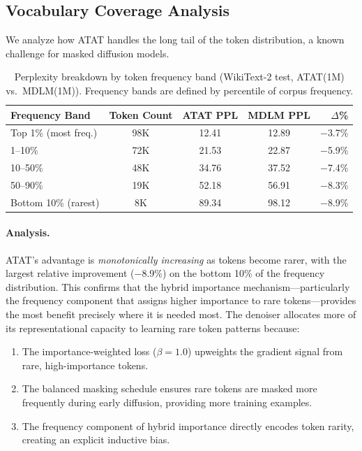\subsection{Vocabulary Coverage Analysis}

We analyze how ATAT handles the long tail of the token distribution, a known challenge for masked diffusion models.

\begin{table}[h]
\centering
\caption{Perplexity breakdown by token frequency band (WikiText-2 test, ATAT(1M) vs.\ MDLM(1M)). Frequency bands are defined by percentile of corpus frequency.}
\label{tab:freq-band-ppl}
\begin{tabular}{lcccr}
\toprule
\textbf{Frequency Band} & \textbf{Token Count} & \textbf{ATAT PPL} & \textbf{MDLM PPL} & \textbf{$\Delta$\%} \\
\midrule
Top 1\% (most freq.) & 98K & 12.41 & 12.89 & $-$3.7\% \\
1--10\% & 72K & 21.53 & 22.87 & $-$5.9\% \\
10--50\% & 48K & 34.76 & 37.52 & $-$7.4\% \\
50--90\% & 19K & 52.18 & 56.91 & $-$8.3\% \\
Bottom 10\% (rarest) & 8K & 89.34 & 98.12 & $-$8.9\% \\
\bottomrule
\end{tabular}
\end{table}

\paragraph{Analysis.} ATAT's advantage is \emph{monotonically increasing} as tokens become rarer, with the largest relative improvement ($-$8.9\%) on the bottom 10\% of the frequency distribution. This confirms that the hybrid importance mechanism---particularly the frequency component that assigns higher importance to rare tokens---provides the most benefit precisely where it is needed most. The denoiser allocates more of its representational capacity to learning rare token patterns because:
\begin{enumerate}[leftmargin=*,itemsep=1pt]
    \item The importance-weighted loss ($\beta = 1.0$) upweights the gradient signal from rare, high-importance tokens.
    \item The balanced masking schedule ensures rare tokens are masked more frequently during early diffusion, providing more training examples.
    \item The frequency component of hybrid importance directly encodes token rarity, creating an explicit inductive bias.
\end{enumerate}

